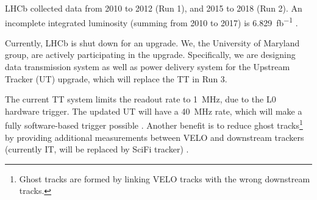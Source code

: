 LHCb collected data from 2010 to 2012 (Run 1), and 2015 to 2018 (Run 2).
An incomplete integrated luminosity (summing from 2010 to 2017) is
\SI{6.829}{fb^{-1}} \cite{LHCb-Facts:2019}.

Currently, LHCb is shut down for an upgrade.
We, the University of Maryland group, are actively participating in the upgrade.
Specifically, we are designing data transmission system as well as power
delivery system for the Upstream Tracker (UT) upgrade, which will replace the TT
in Run 3.

The current TT system limits the readout rate to \SI{1}{MHz}, due to the L0
hardware trigger.
The updated UT will have a \SI{40}{MHz} rate, which will make a fully
software-based trigger possible \cite{LHCbCollaboration:2014tuj}.
Another benefit is to reduce ghost tracks\footnote{
    Ghost tracks are formed by linking VELO tracks with the wrong downstream
    tracks.
} by providing additional measurements between VELO and downstream trackers
(currently IT, will be replaced by SciFi tracker) \cite{Parker:2017}.
